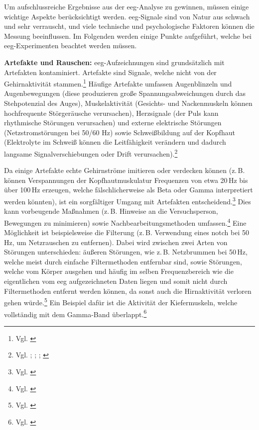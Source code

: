 Um aufschlussreiche Ergebnisse aus der \acrshort{eeg}-Analyse zu gewinnen, müssen einige wichtige Aspekte berücksichtigt werden. \acrshort{eeg}-Signale sind von Natur aus schwach und sehr verrauscht, und viele technische und psychologische Faktoren können die Messung beeinflussen. Im Folgenden werden einige Punkte aufgeführt, welche bei \acrshort{eeg}-Experimenten beachtet werden müssen.

\textbf{Artefakte und Rauschen:} \acrshort{eeg}-Aufzeichnungen sind grundsätzlich mit Artefakten kontaminiert. Artefakte sind Signale, welche nicht von der Gehirnaktivität stammen.\footnote{Vgl. \cite[S.~3]{jiang2019}} Häufige Artefakte umfassen Augenblinzeln und Augenbewegungen (diese produzieren große Spannungsabweichungen durch das Stehpotenzial des Auges), Muskelaktivität (Gesichts- und Nackenmuskeln können hochfrequente Störgeräusche verursachen), Herzsignale (der Puls kann rhythmische Störungen verursachen) und externe elektrische Störungen (Netzstromstörungen bei 50/60 Hz) sowie Schweißbildung auf der Kopfhaut (Elektrolyte im Schweiß können die Leitfähigkeit verändern und dadurch langsame Signalverschiebungen oder Drift verursachen).\footnote{Vgl. \cite[S.~3--4]{jiang2019}; \cite[S.~1--2]{muthukumaraswamy2013}; \cite{light2010}; \cite[S.~890]{kappenman2010}} 

Da einige Artefakte echte Gehirnströme imitieren oder verdecken können (z.\,B. können Verspannungen der Kopfhautmuskulatur Frequenzen von etwa 20\,Hz bis über 100\,Hz erzeugen, welche fälschlicherweise als Beta oder Gamma interpretiert werden könnten), ist ein sorgfältiger Umgang mit Artefakten entscheidend.\footnote{Vgl. \cite[S.~1--2]{muthukumaraswamy2013}} Dies kann vorbeugende Maßnahmen (z.\,B. Hinweise an die Versuchsperson, Bewegungen zu minimieren) sowie Nachbearbeitungsmethoden umfassen.\footnote{Vgl. \cite[S.~1--2]{jiang2019}} Eine Möglichkeit ist beispielsweise die Filterung (z.\,B. Verwendung eines \gls{notch} bei 50 Hz, um Netzrauschen zu entfernen). Dabei wird zwischen zwei Arten von Störungen unterschieden: äußeren Störungen, wie z.\,B. Netzbrummen bei 50\,Hz, welche meist durch einfache Filtermethoden entfernbar sind, sowie Störungen, welche vom Körper ausgehen und häufig im selben Frequenzbereich wie die eigentlichen vom \acrshort{eeg} aufgezeichneten Daten liegen und somit nicht durch Filtermethoden entfernt werden können, da sonst auch die Hirnaktivität verloren gehen würde.\footnote{Vgl. \cite[S.~3]{jiang2019}} Ein Beispiel dafür ist die Aktivität der Kiefermuskeln, welche vollständig mit dem Gamma-Band überlappt.\footnote{Vgl. \cite[S.~1]{muthukumaraswamy2013}}

